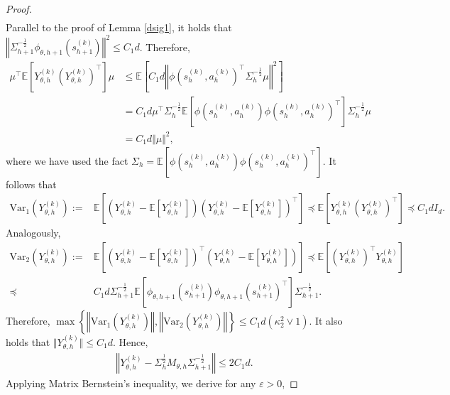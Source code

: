 \documentclass{article}
\numberwithin{equation}{section}
\begin{document}
\begin{proof}
\begin{align*}
\end{align*}		
Parallel to the proof of Lemma \ref{dsig1}, it holds that $\left\Vert \Sigma_{h+1}^{-\frac{1}{2}}\phi_{\theta,h+1}\left(s_{h+1}^{(k)}\right)\right\Vert^2\leq C_1d$. Therefore,
\begin{align*}
    \mu^\top\mathbb{E}\left[Y_{\theta,h}^{(k)}\left(Y_{\theta,h}^{(k)}\right)^\top\right]\mu&\leq \mathbb{E}\left[C_1d\left\Vert\phi\left(s_h^{(k)},a_h^{(k)}\right)^\top\Sigma_h^{-\frac{1}{2}}\mu\right\Vert^2\right]\\
    &=C_1d\mu^\top\Sigma_h^{-\frac{1}{2}}\mathbb{E}\left[\phi\left(s_h^{(k)},a_h^{(k)}\right)\phi\left(s_h^{(k)},a_h^{(k)}\right)^\top\right]\Sigma_h^{-\frac{1}{2}}\mu\\
    &=C_1d\Vert\mu\Vert^2,
\end{align*}
where we have used the fact $\Sigma_h=\mathbb{E}\left[\phi\left(s_h^{(k)},a_h^{(k)}\right) \phi\left(s_h^{(k)},a_h^{(k)}\right)^\top\right]$. It follows that
\begin{align*} 
    \textrm{Var}_1\left(Y_{\theta,h}^{(k)}\right):=&\mathbb{E}\left[\left(Y_{\theta,h}^{(k)}-\mathbb{E}\left[Y_{\theta,h}^{(k)}\right]\right)\left(Y_{\theta,h}^{(k)}-\mathbb{E}\left[Y_{\theta,h}^{(k)}\right]\right)^\top\right]\preceq\mathbb{E}\left[Y_{\theta,h}^{(k)}\left(Y_{\theta,h}^{(k)}\right)^\top\right]\preceq C_1dI_d. 
\end{align*} 
Analogously,
\begin{align*} 
	\textrm{Var}_2\left(Y_{\theta,h}^{(k)}\right):=&\mathbb{E}\left[\left(Y_{\theta,h}^{(k)}-\mathbb{E}\left[Y_{\theta,h}^{(k)}\right]\right)^\top\left(Y_{\theta,h}^{(k)}-\mathbb{E}\left[Y_{\theta,h}^{(k)}\right]\right)\right]\preceq\mathbb{E}\left[\left(Y_{\theta,h}^{(k)}\right)^\top Y_{\theta,h}^{(k)}\right]\\
	\preceq& C_1d\Sigma_{h+1}^{-\frac{1}{2}}\mathbb{E}\left[\phi_{\theta,h+1}\left(s_{h+1}^{(k)}\right)\phi_{\theta,h+1}\left(s_{h+1}^{(k)}\right)^\top\right]\Sigma_{h+1}^{-\frac{1}{2}}. 
\end{align*}
Therefore, $\max\left\{\left\Vert\textrm{Var}_1\left(Y_{\theta,h}^{(k)}\right)\right\Vert, \left\Vert\textrm{Var}_2\left(Y_{\theta,h}^{(k)}\right)\right\Vert\right\}\leq C_1d\left(\kappa_2^2\vee 1\right)$. It also holds that $\Vert Y_{\theta,h}^{(k)}\Vert\leq C_1d$. Hence,
\begin{align*}
    \left\Vert Y_{\theta,h}^{(k)}-\Sigma_h^{\frac{1}{2}}M_{\theta,h}\Sigma_{h+1}^{-\frac{1}{2}} \right\Vert\leq 2C_1d. 
\end{align*}
Applying Matrix Bernstein's inequality, we derive for any $\varepsilon>0$,

\end{proof}
\end{document}
